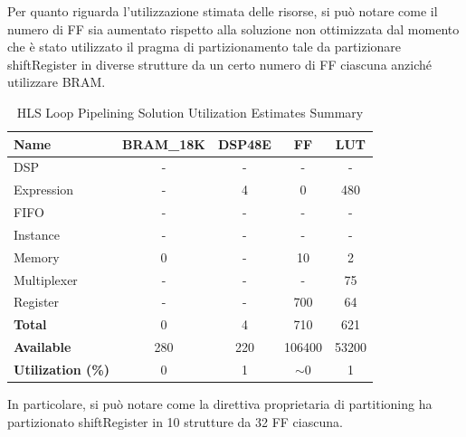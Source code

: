 Per quanto riguarda l'utilizzazione stimata delle risorse, si può notare come il numero di FF sia aumentato rispetto alla soluzione non ottimizzata dal momento che è stato utilizzato il pragma di partizionamento tale da partizionare shiftRegister in diverse strutture da un certo numero di FF ciascuna anziché utilizzare BRAM.

\begin{table}[H]
    \centering
    \begin{tabular}{|l|c|c|c|c|}
        \hline
        \textbf{Name}    & \textbf{BRAM\_18K} & \textbf{DSP48E} & \textbf{FF} & \textbf{LUT} \\ \hline
        DSP              & -                   & -               & -           & -            \\ 
        Expression       & -                   & 4               & 0           & 480          \\ 
        FIFO             & -                   & -               & -           & -            \\ 
        Instance         & -                   & -               & -           & -            \\ 
        Memory           & 0                   & -               & 10          & 2            \\ 
        Multiplexer      & -                   & -               & -           & 75          \\ 
        Register         & -                   & -               & 700         & 64            \\ \hline
        \textbf{Total}   & 0                   & 4               & 710         & 621          \\ \hline
        \textbf{Available} & 280               & 220             & 106400      & 53200        \\ \hline
        \textbf{Utilization (\%)} & 0            & 1              & $\sim$0     & 1      \\ \hline
    \end{tabular}
    \caption{HLS Loop Pipelining Solution Utilization Estimates Summary}
    \label{tab:hls-loop-pipelining-solution-utilization-estimates-summary}
\end{table}

In particolare, si può notare come la direttiva proprietaria di partitioning ha partizionato shiftRegister in 10 strutture da 32 FF ciascuna.

